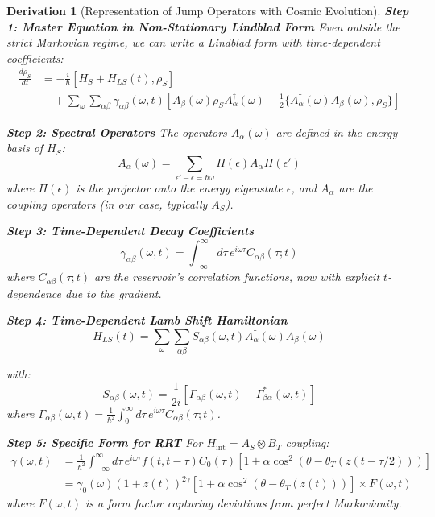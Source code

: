 \documentclass[10pt, a4paper]{article}
\newtheorem{derivation}{Derivation}
\begin{document}
\begin{derivation}[Representation of Jump Operators with Cosmic Evolution]
\textbf{Step 1: Master Equation in Non-Stationary Lindblad Form}
Even outside the strict Markovian regime, we can write a Lindblad form with time-dependent coefficients:
\begin{align}
\frac{d\rho_S}{dt} &= -\frac{i}{\hbar}[H_S + H_{LS}(t), \rho_S] \\
&\quad + \sum_{\omega} \sum_{\alpha\beta} \gamma_{\alpha\beta}(\omega, t) \left[ A_\beta(\omega) \rho_S A_\alpha^\dagger(\omega) - \frac{1}{2} \{ A_\alpha^\dagger(\omega) A_\beta(\omega), \rho_S \} \right]
\tag{25.1}
\end{align}

\textbf{Step 2: Spectral Operators}
The operators $A_\alpha(\omega)$ are defined in the energy basis of $H_S$:
\begin{equation}
A_\alpha(\omega) = \sum_{\epsilon' - \epsilon = \hbar\omega} \Pi(\epsilon) A_\alpha \Pi(\epsilon')
\tag{25.2}
\end{equation}
where $\Pi(\epsilon)$ is the projector onto the energy eigenstate $\epsilon$, and $A_\alpha$ are the coupling operators (in our case, typically $A_S$).

\textbf{Step 3: Time-Dependent Decay Coefficients}
\begin{equation}
\gamma_{\alpha\beta}(\omega, t) = \int_{-\infty}^{\infty} d\tau \, e^{i\omega\tau} C_{\alpha\beta}(\tau; t)
\tag{25.3}
\end{equation}
where $C_{\alpha\beta}(\tau; t)$ are the reservoir's correlation functions, now with explicit $t$-dependence due to the gradient.

\textbf{Step 4: Time-Dependent Lamb Shift Hamiltonian}
\begin{equation}
H_{LS}(t) = \sum_{\omega} \sum_{\alpha\beta} S_{\alpha\beta}(\omega, t) A_\alpha^\dagger(\omega) A_\beta(\omega)
\tag{25.4}
\end{equation}

with:
\begin{equation}
S_{\alpha\beta}(\omega, t) = \frac{1}{2i} \left[ \Gamma_{\alpha\beta}(\omega, t) - \Gamma_{\beta\alpha}^*(\omega, t) \right]
\tag{25.5}
\end{equation}
where $\Gamma_{\alpha\beta}(\omega, t) = \frac{1}{\hbar^2} \int_0^\infty d\tau \, e^{i\omega\tau} C_{\alpha\beta}(\tau; t)$.

\textbf{Step 5: Specific Form for RRT}
For $H_{\text{int}} = A_S \otimes B_T$ coupling:
\begin{align}
\gamma(\omega, t) &= \frac{1}{\hbar^2} \int_{-\infty}^{\infty} d\tau \, e^{i\omega\tau} f(t, t-\tau) C_0(\tau) \left[ 1 + \alpha \cos^2(\theta - \theta_T(z(t-\tau/2))) \right]
\tag{25.6} \\
&= \gamma_0(\omega) (1+z(t))^{2\gamma} \left[ 1 + \alpha \cos^2(\theta - \theta_T(z(t))) \right] \times F(\omega, t)
\tag{25.7}
\end{align}
where $F(\omega, t)$ is a form factor capturing deviations from perfect Markovianity.


\end{derivation}
\end{document}
